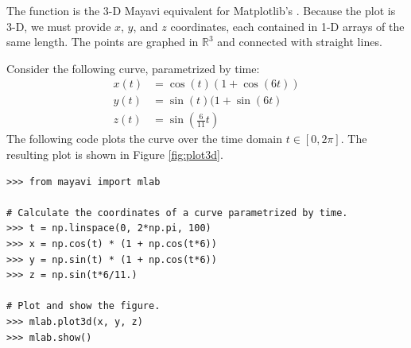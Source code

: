 The function  is the 3-D Mayavi equivalent for Matplotlib's .
Because the plot is 3-D, we must provide $x$, $y$, and $z$ coordinates, each contained in 1-D arrays of the same length.
The points  are graphed in $\mathbb{R}^3$ and connected with straight lines.

Consider the following curve, parametrized by time:
\begin{align*}
x(t) &= \cos(t)(1+\cos(6t))\\
y(t) &= \sin(t)(1+\sin(6t)\\
z(t) &= \sin\left(\frac{6}{11}t\right)
\end{align*}
The following code plots the curve over the time domain $t \in [0,2\pi]$.
The resulting plot is shown in Figure \ref{fig:plot3d}.

\begin{lstlisting}
>>> from mayavi import mlab

# Calculate the coordinates of a curve parametrized by time.
>>> t = np.linspace(0, 2*np.pi, 100)
>>> x = np.cos(t) * (1 + np.cos(t*6))
>>> y = np.sin(t) * (1 + np.cos(t*6))
>>> z = np.sin(t*6/11.)

# Plot and show the figure.
>>> mlab.plot3d(x, y, z)
>>> mlab.show()
\end{lstlisting}

